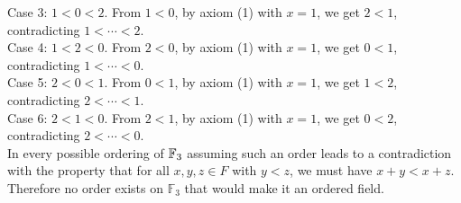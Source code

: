 \documentclass{report}
\begin{document}
\begin{proofWithHibiscus}
  Case 3: $1<0<2$.  
  From $1<0$, by axiom (1) with $x=1$, we get $2<1$, contradicting $1<\cdots<2$.  \\
  
  Case 4: $1<2<0$.  
  From $2<0$, by axiom (1) with $x=1$, we get $0<1$, contradicting $1<\cdots<0$.  \\
  
  Case 5: $2<0<1$.  
  From $0<1$, by axiom (1) with $x=1$, we get $1<2$, contradicting $2<\cdots<1$.  \\
  
  Case 6: $2<1<0$.  
  From $2<1$, by axiom (1) with $x=1$, we get $0<2$, contradicting $2<\cdots<0$.  \\
  
  In every possible ordering of $\mathbb{F}_{3}$ assuming such an order leads to a contradiction with
  the property that for all $x,y,z \in F$ with $y<z$, we must have $x+y<x+z$. Therefore no order exists on $\mathbb{F}_3$ that would make it an ordered field.

\end{proofWithHibiscus}

\end{document}
